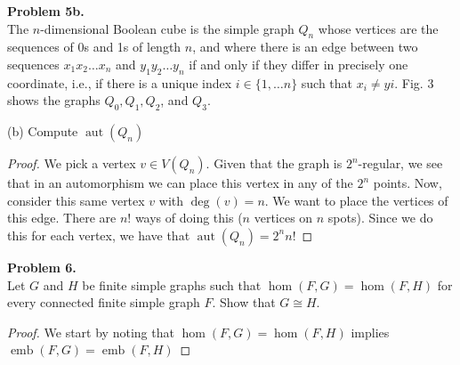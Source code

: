 \documentclass{article}
\newcommand{\set}[1]{\{#1\}}
\DeclareMathOperator*{\aut}{aut}
\DeclareMathOperator*{\emb}{emb}
\newenvironment{hwproof}[2]
{
    \textbf{Problem #1.}\\
    #2
    \begin{proof}
}{
    \end{proof}
    \newpage
}
\begin{document}
\begin{hwproof}
    {5b}
    {
        The $n$-dimensional Boolean cube is the simple graph $Q_n$ whose vertices are the
        sequences of 0s and 1s of length $n$, and where there is an edge between two sequences
        $x_1x_2\dots x_n$ and $y_1y_2\dots y_n$ if and only if they differ in precisely
        one coordinate, i.e., if there is a unique index $i \in \set{1,\dots n}$ such that
        $x_i \neq yi$. Fig. 3 shows the graphs $Q_0, Q_1, Q_2$, and $Q_3$.

        (b) Compute $\aut(Q_n)$
    }
    We pick a vertex $v \in V(Q_n)$. Given that the graph is $2^n$-regular, we see that
    in an automorphism we can place this vertex in any of the $2^n$ points.
    Now, consider this same vertex $v$ with $\deg(v) = n$. We want to place the vertices
    of this edge. There are $n!$ ways of doing this ($n$ vertices on $n$ spots). Since
    we do this for each vertex, we have that $\aut(Q_n) = 2^nn!$
\end{hwproof}

\begin{hwproof}
    {6}
    {
        Let $G$ and $H$ be finite simple graphs such that $\hom(F, G) = \hom(F,H)$ for every
        connected finite simple graph $F$. Show that $G \cong H$.
    }
    We start by noting that $\hom(F,G) = \hom(F, H)$ implies $\emb(F,G) = \emb(F,H)$
\end{hwproof}
\end{document}
